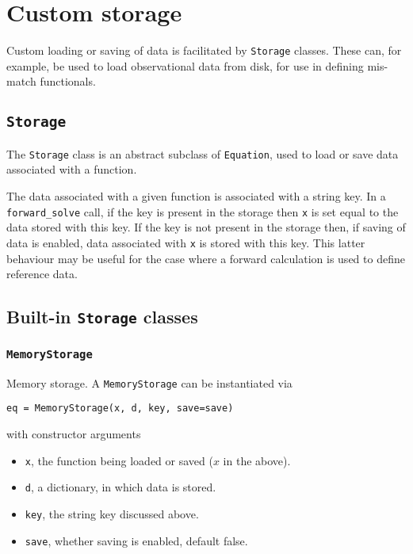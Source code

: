 \documentclass[11pt]{article}
\begin{document}
\section{Custom storage}

Custom loading or saving of data is facilitated by \texttt{Storage} classes.
These can, for example, be used to load observational data from disk, for use
in defining mis-match functionals.

\subsection{\texttt{Storage}}

The \texttt{Storage} class is an abstract subclass of \texttt{Equation}, used
to load or save data associated with a function.

The data associated with a given function is associated with a string key. In
a \texttt{forward\_solve} call, if the key is present in the storage then
\texttt{x} is set equal to the data stored with this key. If the key is not
present in the storage then, if saving of data is enabled, data associated with
\texttt{x} is stored with this key. This latter behaviour may be useful for the
case where a forward calculation is used to define reference data.

\subsection{Built-in \texttt{Storage} classes}

\subsubsection{\texttt{MemoryStorage}}

Memory storage. A \texttt{MemoryStorage} can be instantiated via
\begin{lstlisting}
eq = MemoryStorage(x, d, key, save=save)
\end{lstlisting}
with constructor arguments
\begin{itemize}
  \item \texttt{x}, the function being loaded or saved ($x$ in the above).
  \item \texttt{d}, a dictionary, in which data is stored.
  \item \texttt{key}, the string key discussed above.
  \item \texttt{save}, whether saving is enabled, default false.
\end{itemize}
\end{document}
